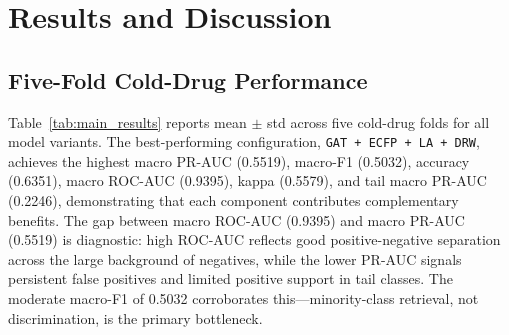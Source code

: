 \documentclass[11pt,a4paper]{report}
\begin{document}
\chapter{Results and Discussion}

\section{Five-Fold Cold-Drug Performance}

Table~\ref{tab:main_results} reports mean $\pm$ std across five cold-drug folds for all model variants. The best-performing configuration, \texttt{GAT + ECFP + LA + DRW}, achieves the highest macro PR-AUC (0.5519), macro-F1 (0.5032), accuracy (0.6351), macro ROC-AUC (0.9395), kappa (0.5579), and tail macro PR-AUC (0.2246), demonstrating that each component contributes complementary benefits. The gap between macro ROC-AUC (0.9395) and macro PR-AUC (0.5519) is diagnostic: high ROC-AUC reflects good positive-negative separation across the large background of negatives, while the lower PR-AUC signals persistent false positives and limited positive support in tail classes. The moderate macro-F1 of 0.5032 corroborates this---minority-class retrieval, not discrimination, is the primary bottleneck.
\end{document}
